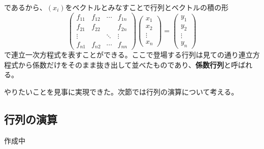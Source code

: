 \documentclass[dvipdfmx]{jsarticle}
\begin{document}
であるから、$(x_i)$をベクトルとみなすことで行列とベクトルの積の形
\[\begin{pmatrix}f_{11}&f_{12}&\cdots&f_{1n}\\f_{21}&f_{22}&{}&f_{2n}\\\vdots&{}&\ddots&\vdots\\f_{n1}&f_{n2}&\cdots&f_{nn}\end{pmatrix}\begin{pmatrix}x_1\\x_2\\\vdots\\x_n\end{pmatrix}=\begin{pmatrix}y_1\\y_2\\\vdots\\y_n\end{pmatrix}\]
で連立一次方程式を表すことができる。ここで登場する行列は見ての通り連立方程式から係数だけをそのまま抜き出して並べたものであり、\textbf{係数行列}と呼ばれる。\\\par
やりたいことを見事に実現できた。次節では行列の演算について考える。\newpage

\subsection{行列の演算}
作成中
\end{document}
